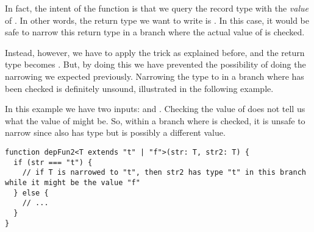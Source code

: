 In fact, the intent of the function is that we query the record type  with the \emph{value} of . In other words, the return type we want to write is . In this case, it would be safe to narrow this return type in a branch where the actual value of  is checked.

Instead, however, we have to apply the trick as explained before, and the return type becomes . But, by doing this we have prevented the possibility of doing the narrowing we expected previously. Narrowing the type  to  in a branch where  has been checked is definitely unsound, illustrated in the following example.

In this example we have two inputs:  and . Checking the value of  does not tell us what the value of  might be. So, within a branch where  is checked, it is unsafe to narrow  since  also has type  but is possibly a different value.

\begin{lstlisting}
function depFun2<T extends "t" | "f">(str: T, str2: T) {
  if (str === "t") {
    // if T is narrowed to "t", then str2 has type "t" in this branch while it might be the value "f"
  } else {
    // ...
  }
}
\end{lstlisting}

